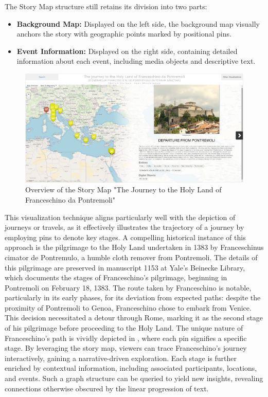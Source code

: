 The Story Map structure still retains its division into two parts:
\begin{itemize}
    \item \textbf{Background Map:} Displayed on the left side, the background map visually anchors the story with geographic points marked by positional pins.
    \item \textbf{Event Information:} Displayed on the right side, containing detailed information about each event, including media objects and descriptive text.
\end{itemize}


\begin{figure}[h!tb]
    \centering
    \includegraphics[scale=0.3]{img/franceschinoOverview.png}
    \caption{Overview of the Story Map "The Journey to the Holy Land of Franceschino da Pontremoli"}
    \label{fig:franceschino}
\end{figure}


This visualization technique aligns particularly well with the depiction of journeys or travels, as it effectively illustrates the trajectory of a journey by employing pins to denote key stages. A compelling historical instance of this approach is the pilgrimage to the Holy Land undertaken in 1383 by Franceschinus cimator de Pontremulo, a humble cloth remover from Pontremoli. The details of this pilgrimage are preserved in manuscript 1153 at Yale’s Beinecke Library, which documents the stages of Franceschino's pilgrimage, beginning in Pontremoli on February 18, 1383. The route taken by Franceschino is notable, particularly in its early phases, for its deviation from expected paths: despite the proximity of Pontremoli to Genoa, Franceschino chose to embark from Venice. This decision necessitated a detour through Rome, marking it as the second stage of his pilgrimage before proceeding to the Holy Land. The unique nature of Franceschino's path is vividly depicted in , where each pin signifies a specific stage. By leveraging the story map, viewers can trace Franceschino’s journey interactively, gaining a narrative-driven exploration. Each stage is further enriched by contextual information, including associated participants, locations, and events. Such a graph structure can be queried to yield new insights, revealing connections otherwise obscured by the linear progression of text.


